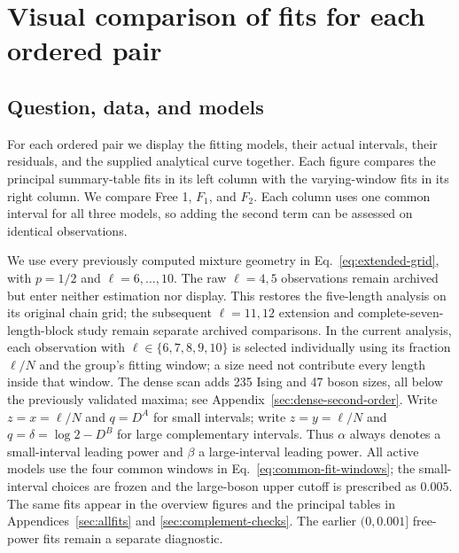 \clearpage
\section{Visual comparison of fits for each ordered pair}
\label{sec:window-selection}
\subsection{Question, data, and models}
For each ordered pair we display the fitting models, their actual
intervals, their residuals, and the supplied analytical curve together.
Each figure compares the principal summary-table fits in its left column
with the varying-window fits in its right column. We compare Free 1,
$F_1$, and $F_2$. Each column uses one common interval for all three
models, so adding the second term can be assessed on identical observations.

We use every previously computed mixture geometry in
Eq.~\eqref{eq:extended-grid}, with $p=1/2$ and $\ell=6,\ldots,10$.
The raw $\ell=4,5$ observations remain archived but enter neither estimation nor display.
This restores the five-length analysis on its original chain grid;
the subsequent $\ell=11,12$ extension and complete-seven-length-block
study remain separate archived comparisons. In the current analysis,
each observation with $\ell\in\{6,7,8,9,10\}$ is selected individually
using its fraction $\ell/N$ and the group's fitting window; a size need
not contribute every length inside that window.
The dense scan adds 235 Ising and 47 boson sizes, all below the previously validated maxima; see Appendix~\ref{sec:dense-second-order}. Write $z=x=\ell/N$
and $q=D^A$ for small intervals; write $z=y=\ell/N$ and
$q=\delta=\log2-D^B$ for large complementary intervals. Thus $\alpha$
always denotes a small-interval leading power and $\beta$ a
large-interval leading power. All active models use the four common windows in
Eq.~\eqref{eq:common-fit-windows}; the small-interval choices are
frozen and the large-boson upper cutoff is prescribed as $0.005$.
The same fits appear in the overview figures and the principal
tables in Appendices~\ref{sec:allfits} and \ref{sec:complement-checks}.
The earlier $(0,0.001]$ free-power fits remain a separate diagnostic.

